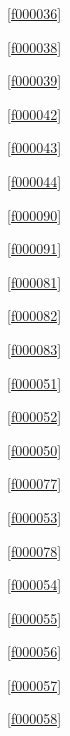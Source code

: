 \noindent\filesourcenumbernameone\ \ref{f000036}\dotfill\pageref{f000036}%

\noindent\filesourcenumbernameone\ \ref{f000038}\dotfill\pageref{f000038}%

\noindent\filesourcenumbernameone\ \ref{f000039}\dotfill\pageref{f000039}%

\noindent\filesourcenumbernameone\ \ref{f000042}\dotfill\pageref{f000042}%

\noindent\filesourcenumbernameone\ \ref{f000043}\dotfill\pageref{f000043}%

\noindent\filesourcenumbernameone\ \ref{f000044}\dotfill\pageref{f000044}%

\noindent\filesourcenumbernameone\ \ref{f000090}\dotfill\pageref{f000090}%

\noindent\filesourcenumbernameone\ \ref{f000091}\dotfill\pageref{f000091}%

\noindent\filesourcenumbernameone\ \ref{f000081}\dotfill\pageref{f000081}%

\noindent\filesourcenumbernameone\ \ref{f000082}\dotfill\pageref{f000082}%

\noindent\filesourcenumbernameone\ \ref{f000083}\dotfill\pageref{f000083}%

\noindent\filesourcenumbernameone\ \ref{f000051}\dotfill\pageref{f000051}%

\noindent\filesourcenumbernameone\ \ref{f000052}\dotfill\pageref{f000052}%

\noindent\filesourcenumbernameone\ \ref{f000050}\dotfill\pageref{f000050}%

\noindent\filesourcenumbernameone\ \ref{f000077}\dotfill\pageref{f000077}%

\noindent\filesourcenumbernameone\ \ref{f000053}\dotfill\pageref{f000053}%

\noindent\filesourcenumbernameone\ \ref{f000078}\dotfill\pageref{f000078}%

\noindent\filesourcenumbernameone\ \ref{f000054}\dotfill\pageref{f000054}%

\noindent\filesourcenumbernameone\ \ref{f000055}\dotfill\pageref{f000055}%

\noindent\filesourcenumbernameone\ \ref{f000056}\dotfill\pageref{f000056}%

\noindent\filesourcenumbernameone\ \ref{f000057}\dotfill\pageref{f000057}%

\noindent\filesourcenumbernameone\ \ref{f000058}\dotfill\pageref{f000058}%

